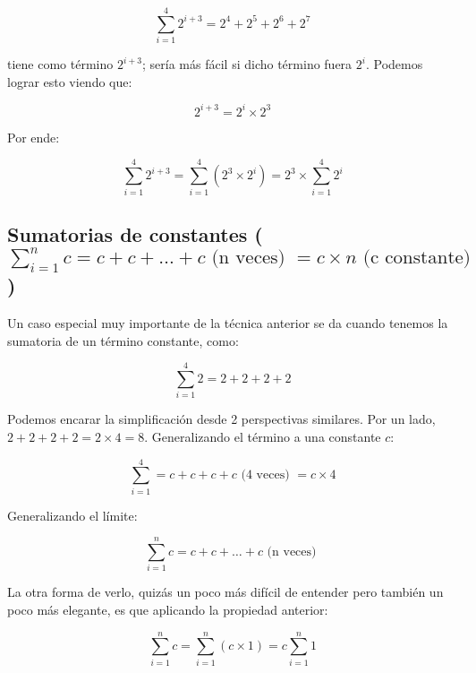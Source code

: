 \begin{equation*}
\sum_{i=1}^4{2^{i+3}} = 2^4+ 2^5+ 2^6 + 2^7
\end{equation*}

tiene como término $2^{i+3}$; sería más fácil si dicho término fuera $2^{i}$. Podemos lograr esto viendo que:

\begin{equation*}
2^{i+3}= 2^i \times 2^3 
\end{equation*}

Por ende:

\begin{equation*}
\sum_{i=1}^4{2^{i+3}} = \sum_{i=1}^4{(2^3 \times 2^i)} = 2^3 \times \sum_{i=1}^4{2^i}
\end{equation*}

\newcommand{\sumaConstantes}{\sum_{i=1}^{n}{c} = c + c + \dots + c \text{ (n veces) }  = c \times n \text{ (c constante) }}
\subsection{Sumatorias de constantes ($\sumaConstantes$)}

Un caso especial muy importante de la técnica anterior se da cuando tenemos la sumatoria de un término constante, como:

\begin{equation*}
\sum_{i=1}^{4}{2}= 2+2+2+2
\end{equation*} 

Podemos encarar la simplificación desde 2 perspectivas similares. Por un lado, $ 2 + 2 + 2 + 2 = 2 \times 4 = 8 $. Generalizando el término a una constante $c$:

\begin{equation*}
	\sum_{i=1}^{4}{} = c + c + c + c \text{ (4 veces) }= c \times 4
\end{equation*}

Generalizando el límite:

\begin{equation*}
	\sum_{i=1}^{n}{c} = c + c + \dots + c \text{ (n veces) }
\end{equation*}

La otra forma de verlo, quizás un poco más difícil de entender pero también un poco más elegante, es que aplicando la propiedad anterior:

\begin{equation*}
	\sum_{i=1}^{n}{c} = \sum_{i=1}^{n}{(c \times 1)} = c \sum_{i=1}^{n}{1}
\end{equation*}

